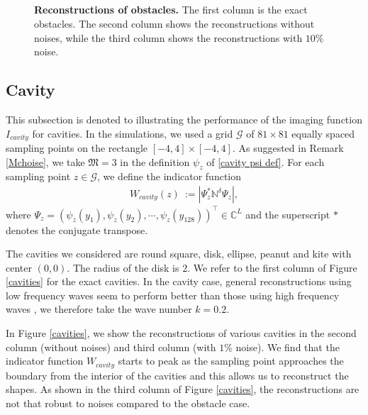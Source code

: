 \documentclass[final]{siamltex}
\newcommand{\C}{{\mathbb C}}
\newcommand{\ben}{\begin{eqnarray*}}
\newcommand{\enn}{\end{eqnarray*}}
\begin{document}
\begin{figure}[htbp]
  \centering
{}\\
\\
  \\
      \\
\caption{{\bf Reconstructions of obstacles.} The first column is the exact obstacles. The second column shows the reconstructions without noises, while the third column shows the reconstructions with $10\%$ noise.}
\label{obstacles}
\end{figure}

\subsection{Cavity}
This subsection is denoted to  illustrating the performance of the   imaging function $I_{cavity}$ for cavities. 
In the simulations, we used a grid $\mathcal{G}$ of $81\times 81$ equally spaced sampling points on the rectangle $[-4,4]\times[-4,4]$.
As suggested in Remark \ref{Mchoise}, we take $\mathfrak{M}=3$ in the definition $\psi_z$ of \eqref{cavity psi def}.
For each sampling point $z \in \mathcal{G}$, we define the indicator function
\ben
W_{cavity}(z)\ :=|\Psi_z^{\ast}\mathbb{N}^{\delta}\Psi_z|,
\enn
where $\Psi_z=(\psi_z(y_1), \psi_z(y_2),\cdots, \psi_z(y_{128}))^\top \in \C^{L}$ and the superscript $*$ denotes the conjugate transpose.

The cavities we considered are round square, disk, ellipse, peanut and kite with center $(0,0)$. The radius of the disk is $2$.
We refer to the first column of Figure \ref{cavities} for the exact cavities. 
In the cavity case, general reconstructions using low frequency waves seem to perform better than those using high frequency waves \cite{ZM2021}, we therefore  take the wave number $k=0.2$. 

In Figure \ref{cavities}, we show the reconstructions of various cavities in the second column (without noises) and third column (with $1\%$ noise). We find that the indicator function $W_{cavity}$ starts to peak as the sampling point approaches the boundary from the interior of the cavities and this allows us to reconstruct  the shapes.  As shown in the third column of Figure \ref{cavities}, the reconstructions are not that robust to noises compared to the obstacle case.  
\end{document}
